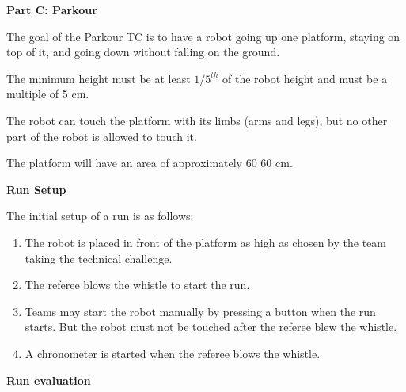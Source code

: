 \clearpage
\sffamily
{\bfseries\color[rgb]{0.4,0.4,0.4} Part C: Parkour}
{}


\bigskip

The goal of the Parkour TC is to have a robot going up one platform, staying on top of it, and going down without falling on the ground.

The minimum height must be at least $1/5^{th}$ of the robot height and must be a multiple of 5 cm.

The robot can touch the platform with its limbs (arms and legs), but no other part of the robot is allowed to touch it.

The platform will have an area of approximately 60 {\texttimes} 60 cm.

\bigskip

{\bfseries Run Setup}

\smallskip

The initial setup of a run is as follows:

\begin{enumerate}

\item The robot is placed in front of the platform as high as chosen by the team taking the technical challenge.

\item The referee blows the whistle to start the run.

\item Teams may start the robot manually by pressing a button when the run starts. But the robot must not be touched after the referee blew the whistle. 

\item A chronometer is started when the referee blows the whistle.
\end{enumerate}

{\bfseries Run evaluation}

\smallskip

